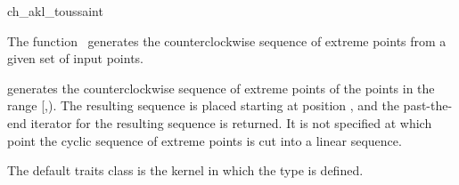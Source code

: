 
\begin{ccRefFunction}{ch_akl_toussaint}  %

\ccDefinition
  
The function \ccRefName\ generates the counterclockwise sequence of extreme
points from a given set of input points.



            {generates the counterclockwise sequence of extreme points
            of the points in the range [,).
            The resulting sequence is placed starting at position
            , and the past-the-end iterator for the resulting
            sequence is returned. It is not specified at which point the
            cyclic sequence of extreme points is cut into a linear sequence.
            \ccPrecond{ %
            The source range [\ccc{first},\ccc{beyond}) does not contain
            \ccc{result}.}}


The default traits class  is the kernel in which the
type  is defined.


\end{ccRefFunction}
